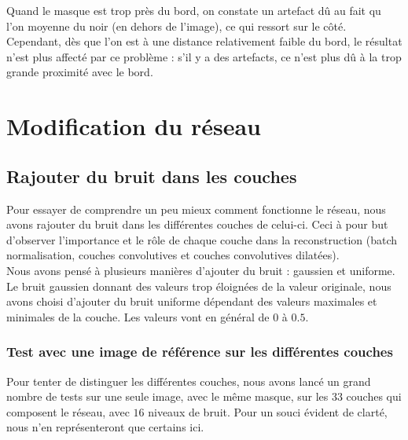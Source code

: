 \documentclass[12pt]{article}
\begin{document}
Quand le masque est trop près du bord, on constate un artefact dû au fait qu l'on moyenne du noir (en dehors de l'image), ce qui ressort sur le côté. Cependant, dès que l'on est à une distance relativement faible du bord, le résultat n'est plus affecté par ce problème : s'il y a des artefacts, ce n'est plus dû à la trop grande proximité avec le bord.

\section{Modification du réseau}

\subsection{Rajouter du bruit dans les couches}
Pour essayer de comprendre un peu mieux comment fonctionne le réseau,
nous avons rajouter du bruit dans les différentes couches de celui-ci.
Ceci à pour but d'observer l'importance et le rôle de chaque couche dans la
reconstruction (batch normalisation, couches convolutives et couches convolutives dilatées).\\
Nous avons pensé à plusieurs manières d'ajouter du bruit : gaussien et
uniforme. Le bruit gaussien donnant des valeurs trop éloignées de la valeur originale, nous avons choisi d'ajouter du bruit uniforme dépendant des valeurs maximales et minimales de la couche. Les valeurs vont en général de $0$ à $0.5$.\\

\subsubsection{Test avec une image de référence sur les différentes couches}
Pour tenter de distinguer les différentes couches, nous avons lancé un grand nombre de tests sur une seule image, avec le même masque, sur les 33 couches qui composent le réseau, avec $16$ niveaux de bruit. Pour un souci évident de clarté, nous n'en représenteront que certains ici.
\end{document}
